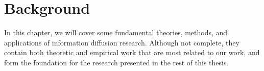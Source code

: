 \documentclass[phd,tocprelim]{cornell}
\begin{document}








\chapter{Background}
\label{chap:background}


In this chapter, we will cover some fundamental theories, methods, and applications of information diffusion research. Although not complete, they contain both theoretic and empirical work that are most related to our work, and form the foundation for the research presented in the rest of this thesis.
\end{document}
